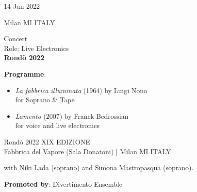 \documentclass[7pt,a4paper]{article}
\begin{document}
\begin{mdframed}[
    backgroundcolor=entrygray,
    linecolor=entrygray,
    linewidth=0pt,
    innerleftmargin=6pt,
    innerrightmargin=6pt,
    innertopmargin=6pt,
    innerbottommargin=6pt,
    skipabove=0pt,
    skipbelow=0pt
]

\begin{minipage}[t]{0.28\textwidth}

14 Jun 2022

\scriptsize Milan MI ITALY


\end{minipage}
\begin{minipage}[t]{0.68\textwidth}
\small Concert
\\\scriptsize Role: Live Electronics
\\ \normalsize \textbf{Rondò 2022}


\vspace{0.25cm}

\par \scriptsize \textbf{Programme}:\par
\begin{itemize}

\item \textit{La fabbrica illuminata} (1964) by Luigi Nono\\ for Soprano \& Tape

\item \textit{Lamento} (2007) by Franck Bedrossian\\ for voice and live electronics

\end{itemize}
\vspace{0.2cm}



\small Rondò 2022 XIX EDIZIONE\\Fabbrica del Vapore (Sala Donatoni) | \scriptsize Milan MI ITALY

\vspace{0.1cm}
\scriptsize

with Niki Lada (soprano) and Simona Mastropasqua (soprano).

\vspace{0.1cm}
\par \textbf{Promoted by}: Divertimento Ensemble
\end{minipage}
\vspace{0.25cm}
\end{mdframed}
\end{document}

